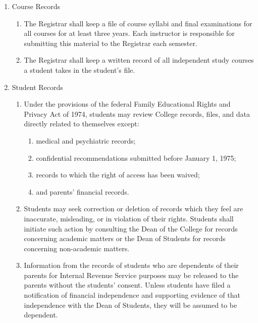 \documentclass{manual}
\newcommand{\itemLevelA}{\alph*.}
\newcommand{\itemLevelB}{\arabic*)}
\newcommand{\itemRefA}{\alph*}
\newcommand{\itemRefB}{\arabic*}
\begin{document}
\begin{enumerate}[label=\itemLevelA,ref=\itemRefA]
\item Course Records

\begin{enumerate}[label=\itemLevelB,ref=\itemRefB]

\item The Registrar shall keep a file of course syllabi  and final examinations for all courses for at least three years. Each instructor is responsible for submitting this material to the Registrar each semester.

\item The Registrar  shall keep a written record of all independent study courses a student takes in the student's file.

\end{enumerate}


\item Student Records

\begin{enumerate}[label=\itemLevelB,ref=\itemRefB]

\item Under the provisions of the federal Family Educational Rights and Privacy Act of 1974, students may review College records, files, and data directly related to themselves except: 

\begin{enumerate}[label=\alph*)]

\item medical and psychiatric records; 

\item confidential recommendations submitted before January 1, 1975;

\item records to which the right of access has been waived; 

\item and parents' financial records.
\end{enumerate}

\item Students may seek correction or deletion of records which they feel are inaccurate, misleading, or in violation of their rights. Students shall initiate such action by consulting the Dean of the College for records concerning academic matters or the Dean of Students for records concerning non-academic matters.

\item Information from the records of students who are dependents of their parents for Internal Revenue Service purposes may be released to the parents without the students' consent. Unless students have filed a notification of financial independence and supporting evidence of that independence with the Dean of Students, they will be assumed to be dependent.


\end{enumerate}
\end{enumerate}
\end{document}

